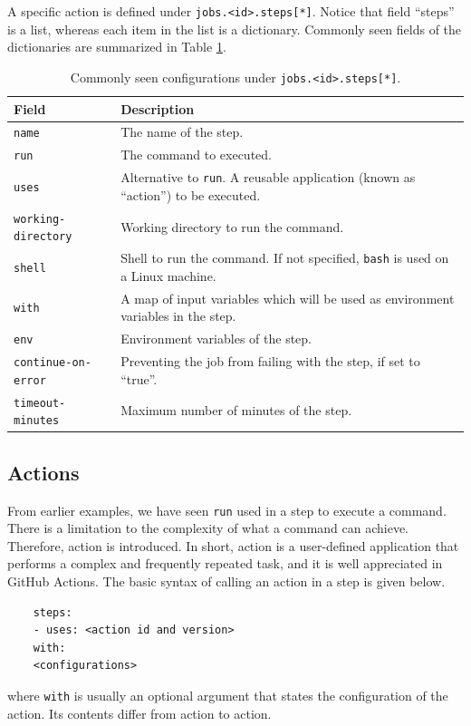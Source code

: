 A specific action is defined under \texttt{jobs.<id>.steps[*]}. Notice that field ``steps'' is a list, whereas each item in the list is a dictionary. Commonly seen fields of the dictionaries are summarized in Table \ref{tab:githubactions_steps}.
\begin{table}[!htb]
	\centering \caption{Commonly seen configurations under \texttt{jobs.<id>.steps[*]}.}\label{tab:githubactions_steps}
	\begin{tabularx}{\textwidth}{lX}
		\hline
		Field & Description \\ \hline
		\texttt{name} & The name of the step. \\ 
		\texttt{run} & The command to executed. \\
		\texttt{uses} & Alternative to \texttt{run}. A reusable application (known as ``action'') to be executed. \\
		\texttt{working-directory} & Working directory to run the command. \\
		\texttt{shell} & Shell to run the command. If not specified, \texttt{bash} is used on a Linux machine. \\
		\texttt{with} & A map of input variables which will be used as environment variables in the step. \\
		\texttt{env} & Environment variables of the step. \\
		\texttt{continue-on-error} & Preventing the job from failing with the step, if set to ``true''. \\
		\texttt{timeout-minutes} & Maximum number of minutes of the step. \\
		\hline
	\end{tabularx}
\end{table}

\subsection{Actions}

From earlier examples, we have seen \verb|run| used in a step to execute a command. There is a limitation to the complexity of what a command can achieve. Therefore, action is introduced. In short, action is a user-defined application that performs a complex and frequently repeated task, and it is well appreciated in GitHub Actions. The basic syntax of calling an action in a step is given below.
\begin{lstlisting}
	steps:
	- uses: <action id and version>
	with:
	<configurations>    
\end{lstlisting}
where \verb|with| is usually an optional argument that states the configuration of the action. Its contents differ from action to action.

